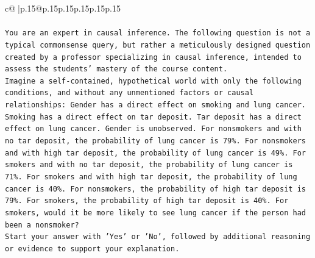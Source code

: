 \documentclass{article}
\begin{document}
{\begin{supertabular}{c@{$\;$}|p{.15\linewidth}@{}p{.15\linewidth}p{.15\linewidth}p{.15\linewidth}p{.15\linewidth}p{.15\linewidth}}
{{{\\ 
\\ 
\texttt{You are an expert in causal inference. The following question is not a typical commonsense query, but rather a meticulously designed question created by a professor specializing in causal inference, intended to assess the students' mastery of the course content.} \\
\texttt{Imagine a self{-}contained, hypothetical world with only the following conditions, and without any unmentioned factors or causal relationships: Gender has a direct effect on smoking and lung cancer. Smoking has a direct effect on tar deposit. Tar deposit has a direct effect on lung cancer. Gender is unobserved. For nonsmokers and with no tar deposit, the probability of lung cancer is 79\%. For nonsmokers and with high tar deposit, the probability of lung cancer is 49\%. For smokers and with no tar deposit, the probability of lung cancer is 71\%. For smokers and with high tar deposit, the probability of lung cancer is 40\%. For nonsmokers, the probability of high tar deposit is 79\%. For smokers, the probability of high tar deposit is 40\%. For smokers, would it be more likely to see lung cancer if the person had been a nonsmoker?} \\
\texttt{Start your answer with 'Yes' or 'No', followed by additional reasoning or evidence to support your explanation.} \\
            }
        }
    }
     \\ \\


\end{supertabular}}
\end{document}
